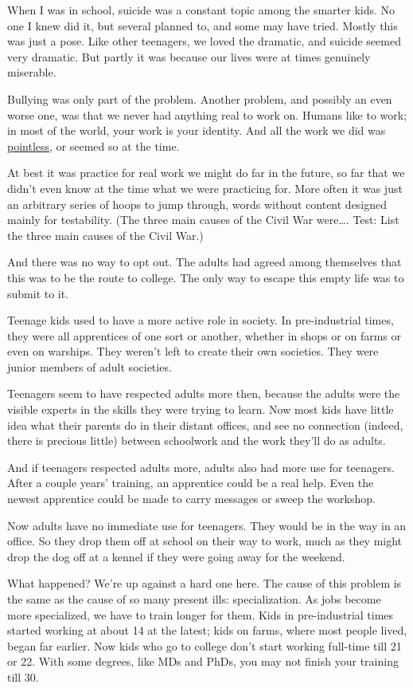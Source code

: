 \documentclass[12pt]{book}
\begin{document}
When I was in school, suicide was a constant topic among the smarter
kids. No one I knew did it, but several planned to, and some may have
tried. Mostly this was just a pose. Like other teenagers, we loved the
dramatic, and suicide seemed very dramatic. But partly it was because
our lives were at times genuinely miserable.

Bullying was only part of the problem. Another problem, and possibly an
even worse one, was that we never had anything real to work on. Humans
like to work; in most of the world, your work is your identity. And all
the work we did was \href{essay.html}{pointless}, or seemed so at the
time.

At best it was practice for real work we might do far in the future, so
far that we didn't even know at the time what we were practicing for.
More often it was just an arbitrary series of hoops to jump through,
words without content designed mainly for testability. (The three main
causes of the Civil War were\ldots. Test: List the three main causes of
the Civil War.)

And there was no way to opt out. The adults had agreed among themselves
that this was to be the route to college. The only way to escape this
empty life was to submit to it.

Teenage kids used to have a more active role in society. In
pre-industrial times, they were all apprentices of one sort or another,
whether in shops or on farms or even on warships. They weren't left to
create their own societies. They were junior members of adult societies.

Teenagers seem to have respected adults more then, because the adults
were the visible experts in the skills they were trying to learn. Now
most kids have little idea what their parents do in their distant
offices, and see no connection (indeed, there is precious little)
between schoolwork and the work they'll do as adults.

And if teenagers respected adults more, adults also had more use for
teenagers. After a couple years' training, an apprentice could be a real
help. Even the newest apprentice could be made to carry messages or
sweep the workshop.

Now adults have no immediate use for teenagers. They would be in the way
in an office. So they drop them off at school on their way to work, much
as they might drop the dog off at a kennel if they were going away for
the weekend.

What happened? We're up against a hard one here. The cause of this
problem is the same as the cause of so many present ills:
specialization. As jobs become more specialized, we have to train longer
for them. Kids in pre-industrial times started working at about 14 at
the latest; kids on farms, where most people lived, began far earlier.
Now kids who go to college don't start working full-time till 21 or 22.
With some degrees, like MDs and PhDs, you may not finish your training
till 30.
\end{document}
